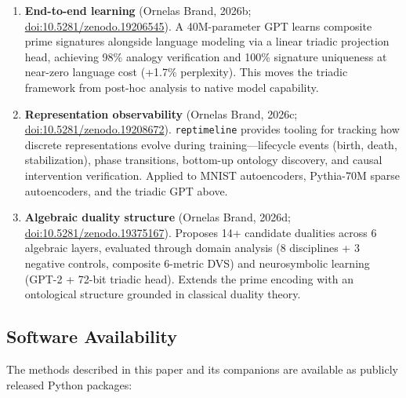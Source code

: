 \documentclass[10pt]{article}
\begin{document}
\begin{enumerate}[nosep, leftmargin=*]
    \item \textbf{End-to-end learning} (Ornelas Brand, 2026b; \href{https://doi.org/10.5281/zenodo.19206545}{doi:10.5281/zenodo.19206545}). A 40M-parameter GPT learns composite prime signatures alongside language modeling via a linear triadic projection head, achieving 98\% analogy verification and 100\% signature uniqueness at near-zero language cost (+1.7\% perplexity). This moves the triadic framework from post-hoc analysis to native model capability.
    \item \textbf{Representation observability} (Ornelas Brand, 2026c; \href{https://doi.org/10.5281/zenodo.19208672}{doi:10.5281/zenodo.19208672}). \texttt{reptimeline} provides tooling for tracking how discrete representations evolve during training---lifecycle events (birth, death, stabilization), phase transitions, bottom-up ontology discovery, and causal intervention verification. Applied to MNIST autoencoders, Pythia-70M sparse autoencoders, and the triadic GPT above.
    \item \textbf{Algebraic duality structure} (Ornelas Brand, 2026d; \href{https://doi.org/10.5281/zenodo.19375167}{doi:10.5281/zenodo.19375167}). Proposes 14+ candidate dualities across 6 algebraic layers, evaluated through domain analysis (8 disciplines + 3 negative controls, composite 6-metric DVS) and neurosymbolic learning (GPT-2 + 72-bit triadic head). Extends the prime encoding with an ontological structure grounded in classical duality theory.
\end{enumerate}

\subsection{Software Availability}

The methods described in this paper and its companions are available as publicly released Python packages:
\end{document}
